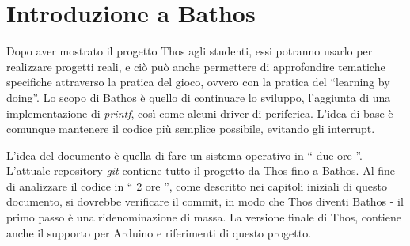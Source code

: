 \documentclass[a4paper,12pt]{report}
\begin{document}


\section{Introduzione a Bathos}

Dopo aver mostrato il progetto Thos agli studenti, essi potranno usarlo per realizzare progetti reali, e ciò può anche permettere di approfondire tematiche specifiche attraverso la pratica del gioco, ovvero con la pratica del ``learning by doing''. Lo scopo di Bathos è quello di continuare lo sviluppo, l'aggiunta di una implementazione di \textit{printf}, così come alcuni driver di periferica. L'idea di base è comunque mantenere il codice più semplice possibile, evitando gli interrupt.



L'idea del documento è quella di fare un sistema operativo in `` due ore ''. L'attuale repository \textit{git} contiene tutto il progetto da Thos fino a Bathos. Al fine di analizzare il codice  in `` 2 ore '', come descritto nei capitoli iniziali di questo documento, si dovrebbe verificare il commit, in modo che Thos diventi Bathos - il primo passo è una ridenominazione di massa. La versione finale di Thos, contiene anche il supporto per Arduino e riferimenti di questo progetto. 
\end{document}
